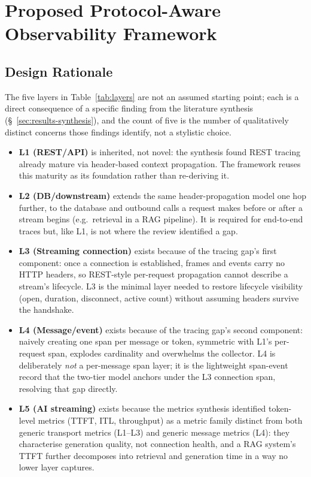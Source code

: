 \documentclass[11pt]{article}
\begin{document}
\section{Proposed Protocol-Aware Observability Framework}

\subsection{Design Rationale}
\label{sec:rationale}
The five layers in Table~\ref{tab:layers} are not an assumed starting point; each is a direct consequence of a specific finding from the literature synthesis (\S~\ref{sec:results-synthesis}), and the count of five is the number of qualitatively distinct concerns those findings identify, not a stylistic choice.
\begin{itemize}
\item \textbf{L1 (REST/API)} is inherited, not novel: the synthesis found REST tracing already mature via header-based context propagation. The framework reuses this maturity as its foundation rather than re-deriving it.
\item \textbf{L2 (DB/downstream)} extends the same header-propagation model one hop further, to the database and outbound calls a request makes before or after a stream begins (e.g.\ retrieval in a RAG pipeline). It is required for end-to-end traces but, like L1, is not where the review identified a gap.
\item \textbf{L3 (Streaming connection)} exists because of the tracing gap's first component: once a connection is established, frames and events carry no HTTP headers, so REST-style per-request propagation cannot describe a stream's lifecycle. L3 is the minimal layer needed to restore lifecycle visibility (open, duration, disconnect, active count) without assuming headers survive the handshake.
\item \textbf{L4 (Message/event)} exists because of the tracing gap's second component: naively creating one span per message or token, symmetric with L1's per-request span, explodes cardinality and overwhelms the collector. L4 is deliberately \emph{not} a per-message span layer; it is the lightweight span-event record that the two-tier model anchors under the L3 connection span, resolving that gap directly.
\item \textbf{L5 (AI streaming)} exists because the metrics synthesis identified token-level metrics (TTFT, ITL, throughput) as a metric family distinct from both generic transport metrics (L1--L3) and generic message metrics (L4): they characterise generation quality, not connection health, and a RAG system's TTFT further decomposes into retrieval and generation time in a way no lower layer captures.
\end{itemize}
\end{document}
